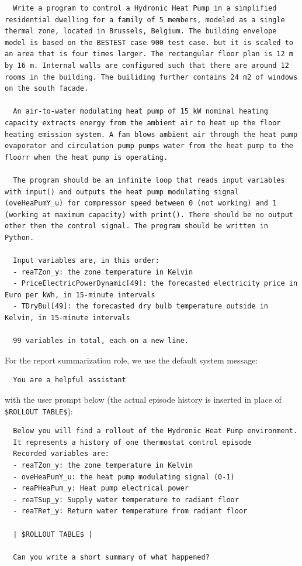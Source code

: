 \begin{lstlisting}
  Write a program to control a Hydronic Heat Pump in a simplified residential dwelling for a family of 5 members, modeled as a single thermal zone, located in Brussels, Belgium. The building envelope model is based on the BESTEST case 900 test case. but it is scaled to an area that is four times larger. The rectangular floor plan is 12 m by 16 m. Internal walls are configured such that there are around 12 rooms in the building. The builiding further contains 24 m2 of windows on the south facade.

  An air-to-water modulating heat pump of 15 kW nominal heating capacity extracts energy from the ambient air to heat up the floor heating emission system. A fan blows ambient air through the heat pump evaporator and circulation pump pumps water from the heat pump to the floorr when the heat pump is operating. 
  
  The program should be an infinite loop that reads input variables with input() and outputs the heat pump modulating signal (oveHeaPumY_u) for compressor speed between 0 (not working) and 1 (working at maximum capacity) with print(). There should be no output other then the control signal. The program should be written in Python.
  
  Input variables are, in this order:
  - reaTZon_y: the zone temperature in Kelvin
  - PriceElectricPowerDynamic[49]: the forecasted electricity price in Euro per kWh, in 15-minute intervals
  - TDryBul[49]: the forecasted dry bulb temperature outside in Kelvin, in 15-minute intervals

  99 variables in total, each on a new line.
\end{lstlisting}

For the report summarization role, we use the default system message:

\begin{lstlisting}
  You are a helpful assistant
\end{lstlisting}

with the user prompt below (the actual episode history is inserted in place of \verb|$ROLLOUT TABLE$|):

\begin{lstlisting}
  Below you will find a rollout of the Hydronic Heat Pump environment.
  It represents a history of one thermostat control episode
  Recorded variables are:
  - reaTZon_y: the zone temperature in Kelvin
  - oveHeaPumY_u: the heat pump modulating signal (0-1)
  - reaPHeaPum_y: Heat pump electrical power
  - reaTSup_y: Supply water temperature to radiant floor
  - reaTRet_y: Return water temperature from radiant floor

  | $ROLLOUT TABLE$ |

  Can you write a short summary of what happened?
\end{lstlisting}

